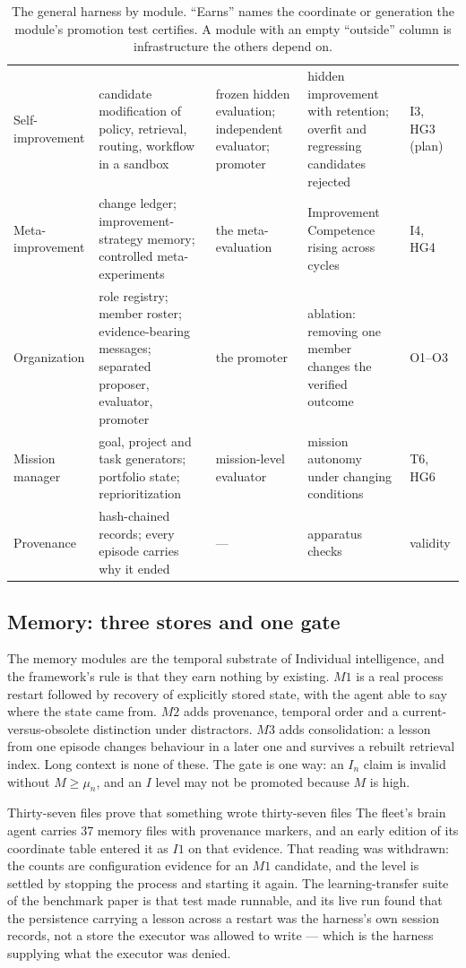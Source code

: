 \documentclass[11pt]{article}
\theoremstyle{definition}
\begin{document}
\begin{table}[!htbp]
\begin{tabularx}{\textwidth}{@{}lYYYl@{}}
Self-improvement & candidate modification of policy, retrieval, routing, workflow in a sandbox & frozen hidden evaluation; independent evaluator; promoter & hidden improvement with retention; overfit and regressing candidates rejected & I3, HG3 (plan) \\
Meta-improvement & change ledger; improvement-strategy memory; controlled meta-experiments & the meta-evaluation & Improvement Competence rising across cycles & I4, HG4 \\
Organization & role registry; member roster; evidence-bearing messages; separated proposer, evaluator, promoter & the promoter & ablation: removing one member changes the verified outcome & O1--O3 \\
Mission manager & goal, project and task generators; portfolio state; reprioritization & mission-level evaluator & mission autonomy under changing conditions & T6, HG6 \\
Provenance & hash-chained records; every episode carries why it ended & --- & apparatus checks & validity \\
\bottomrule
\end{tabularx}
\caption{The general harness by module. ``Earns'' names the coordinate or generation the module's promotion test certifies. A module with an empty ``outside'' column is infrastructure the others depend on.}
\label{tab:modules}
\end{table}

\subsection{Memory: three stores and one gate}

The memory modules are the temporal substrate of Individual intelligence, and the framework's rule is that they earn nothing by existing. $M1$ is a real process restart followed by recovery of explicitly stored state, with the agent able to say where the state came from. $M2$ adds provenance, temporal order and a current-versus-obsolete distinction under distractors. $M3$ adds consolidation: a lesson from one episode changes behaviour in a later one and survives a rebuilt retrieval index. Long context is none of these. The gate is one way: an $I_n$ claim is invalid without $M \ge \mu_n$, and an $I$ level may not be promoted because $M$ is high.

\begin{cautionbox}{Thirty-seven files prove that something wrote thirty-seven files}
The fleet's brain agent carries 37 memory files with provenance markers, and an early edition of its coordinate table entered it as $I1$ on that evidence. That reading was withdrawn: the counts are configuration evidence for an $M1$ candidate, and the level is settled by stopping the process and starting it again. The learning-transfer suite of the benchmark paper is that test made runnable, and its live run found that the persistence carrying a lesson across a restart was the harness's own session records, not a store the executor was allowed to write --- which is the harness supplying what the executor was denied.
\end{cautionbox}
\end{document}
